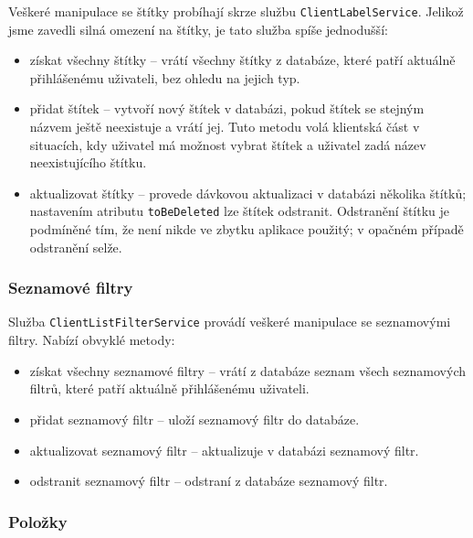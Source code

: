 Veškeré manipulace se štítky probíhají skrze službu \verb|ClientLabelService|.
Jelikož jsme zavedli silná omezení na štítky, je tato služba spíše jednodušší:
\begin{itemize}
	\item získat všechny štítky -- vrátí všechny štítky z databáze, které patří aktuálně přihlášenému uživateli, bez ohledu na jejich typ.
	\item přidat štítek -- vytvoří nový štítek v databázi, pokud štítek se stejným názvem ještě neexistuje a vrátí jej.
		Tuto metodu volá klientská část v situacích, kdy uživatel má možnost vybrat štítek a uživatel zadá název neexistujícího štítku.
	\item aktualizovat štítky -- provede dávkovou aktualizaci v databázi několika štítků; nastavením atributu \verb|toBeDeleted| lze štítek odstranit.
		Odstranění štítku je podmíněné tím, že není nikde ve zbytku aplikace použitý; v opačném případě odstranění selže.
\end{itemize}

\subsubsection{Seznamové filtry}

Služba \verb|ClientListFilterService| provádí veškeré manipulace se seznamovými filtry.
Nabízí obvyklé metody:
\begin{itemize}
	\item získat všechny seznamové filtry -- vrátí z databáze seznam všech seznamových filtrů, které patří aktuálně přihlášenému uživateli.
	\item přidat seznamový filtr -- uloží seznamový filtr do databáze.
	\item aktualizovat seznamový filtr -- aktualizuje v databázi seznamový filtr.
	\item odstranit seznamový filtr -- odstraní z databáze seznamový filtr.
\end{itemize}

\subsubsection{Položky}

